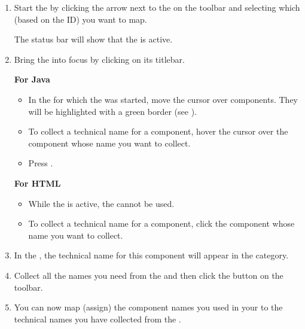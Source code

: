\begin{enumerate}
\item Start the \gdomm{} by clicking the arrow next to the on the toolbar and selecting which \gdaut{} (based on the \gdaut{} ID) you want to map. 


The status bar will show that the \gdomm{} is active. 
\item Bring the \gdaut{} into focus by clicking on its titlebar. 

\textbf{For Java \gdauts{}}
\begin{itemize}
\item In the \gdaut{} for which the \gdomm{} was started, move the cursor over components. They will be highlighted with a green border (see ). 
\item To collect a technical name for a component, hover the cursor over the component whose name you want to collect. 
\item Press .
\end{itemize}
\textbf{For HTML \gdauts{}}
\begin{itemize}
\item While the \gdomm{} is active, the \gdaut{} cannot be used. 
\item To collect a technical name for a component, click the component whose name you want to collect. 
\end{itemize}

\item In the \gdomeditor{}, the technical name for this component will appear in the  category. 
\item Collect all the names you need from the \gdaut{} and then click the  button on the toolbar. 
\item You can now map (assign) the component names you used in your \gdcases{} to the technical names you have collected from the \gdaut{} .
\end{enumerate}

